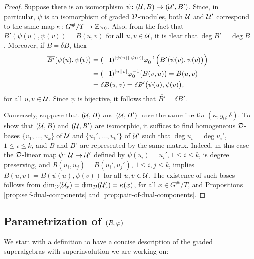 \begin{proof}
	Suppose there is an isomorphism $\psi\colon (\mathcal U, B) \to (\mathcal U', B')$.
	Since, in particular, $\psi$ is an isomorphism of graded $\mathcal{D}$-modules, both $\mathcal U$ and $\mathcal U'$ correspond to the same map $\kappa\colon G^\#/T \to \mathbb{Z}_{\geq 0}$.
	Also, from the fact that $B'(\psi(u), \psi(v)) = B(u, v)$ for all $u, v\in \mathcal U$, it is clear that $\deg B' = \deg B$.
	Moreover, if $\overline{B} = \delta B$, then
	\begin{align*}
		\overline{B'} \big(\psi(u), \psi(v) \big) & = (-1)^{|\psi(u)||\psi(v)|} \varphi_0^{-1} \Big( B'\big( \psi(v) , \psi(u) \big) \Big) \\
		                                          & = (-1)^{|u||v|} \varphi_0^{-1} \big( B(v, u) \big)
		= \overline{B} (u, v)                                                                                                         \\
		                                          & = \delta B(u, v) = \delta B' \big( \psi(u), \psi(v) \big),
	\end{align*}
	for all $u, v \in \mathcal U$.
	Since $\psi$ is bijective, it follows that $\overline{B'} = \delta B'$.

	Conversely, suppose that $(\mathcal U, B)$ and $(\mathcal U, B')$ have the same inertia $(\kappa, g_0, \delta)$.
	To show that $(\mathcal U, B)$ and $(\mathcal U, B')$ are isomorphic, it suffices to find homogeneous $\mathcal{D}$-bases $\{u_1, \ldots, u_k\}$ of $\mathcal U$ and $\{u_1', \ldots, u_k'\}$ of $\mathcal U'$ such that $\deg u_i = \deg u_i'$, $1 \leq i \leq k$, and $B$ and $B'$ are represented by the same matrix.
	Indeed, in this case the $\mathcal{D}$-linear map $\psi\colon \mathcal U \to \mathcal U'$ defined by $\psi(u_i) = u_i'$, $1 \leq i \leq k$, is degree preserving, and $B(u_i, u_j) = B(u_i', u_j')$, $1 \leq i,j \leq k$, implies $B(u, v) = B( \psi(u), \psi(v) )$ for all $u, v\in \mathcal U$.
	The existence of such bases follows from $\dim_{\mathcal{D}} (\mathcal U_x) = \dim_{\mathcal{D}} (\mathcal U_x') = \kappa(x)$, for all $x \in G^\#/T$, and Propositions \ref{prop:self-dual-components} and \ref{prop:pair-of-dual-components}.
\end{proof}

\subsection{Parametrization of \texorpdfstring{$(R, \varphi)$}{(R,phi)}}\label{subsec:param-(R-phi)}

We start with a definition to have a concise description of the graded superalgebras with superinvolution we are working on:

